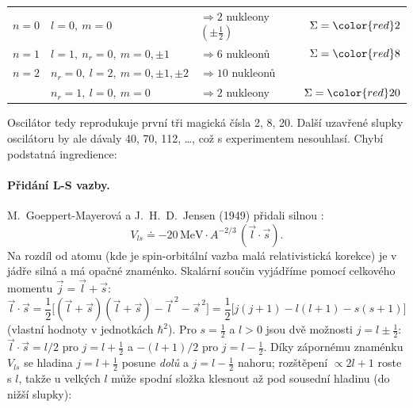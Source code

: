 \begin{center}
\begin{tabular}{l l l r}
  \(n=0\) & \(l=0,\ m=0\) & \(\Rightarrow 2\) nukleony \((\pm\tfrac12)\) & \(\Sigma = \color{red}2\)\\[2pt]
  \(n=1\) & \(l=1,\ n_r=0,\ m=0,\pm1\) & \(\Rightarrow 6\) nukleonů & \(\Sigma = \color{red}8\)\\[2pt]
  \(n=2\) & \(n_r=0,\ l=2,\ m=0,\pm1,\pm2\) & \(\Rightarrow 10\) nukleonů & \\
          & \(n_r=1,\ l=0,\ m=0\) & \(\Rightarrow 2\) nukleony & \(\Sigma = \color{red}20\)
\end{tabular}
\end{center}
Oscilátor tedy reprodukuje první tři magická čísla 2, 8, 20. Další uzavřené
slupky oscilátoru by ale dávaly 40, 70, 112, \dots, což s experimentem
nesouhlasí. Chybí podstatná ingredience:

\paragraph{Přidání L-S vazby.} M.~Goeppert-Mayerová a J.~H.~D.~Jensen (1949)
přidali silnou :
\[
  V_{ls} \doteq -20\,\mathrm{MeV}\cdot A^{-2/3}\,(\vec l\cdot\vec s) .
\]
Na rozdíl od atomu (kde je spin-orbitální vazba malá relativistická
korekce) je v jádře silná a má opačné znaménko. Skalární součin vyjádříme
pomocí celkového momentu \(\vec j=\vec l+\vec s\):
\[
  \vec l\cdot\vec s = \frac12\Big[(\vec l+\vec s)(\vec l+\vec s) - \vec l^{\,2} - \vec s^{\,2}\Big]
  = \frac12\Big[j(j+1) - l(l+1) - s(s+1)\Big]
\]
(vlastní hodnoty v jednotkách \(\hbar^2\)). Pro \(s=\tfrac12\) a \(l>0\) jsou
dvě možnosti \(j=l\pm\tfrac12\): \(\vec l\cdot\vec s = l/2\) pro \(j=l+\tfrac12\)
a \(-(l+1)/2\) pro \(j=l-\tfrac12\). Díky zápornému znaménku \(V_{ls}\) se
hladina \(j=l+\tfrac12\) posune \emph{dolů} a \(j=l-\tfrac12\) nahoru;
rozštěpení \(\propto 2l+1\) roste s \(l\), takže u velkých \(l\) může
spodní složka klesnout až pod sousední hladinu (do nižší slupky):
\begin{center}
\end{center}

